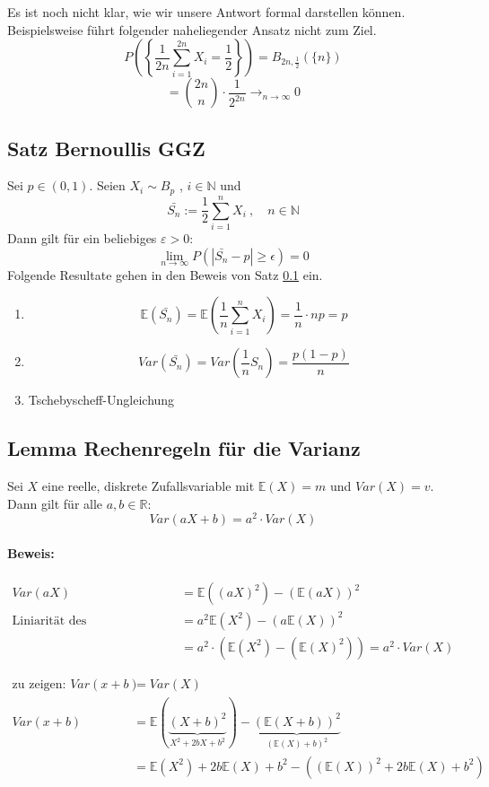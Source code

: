 \documentclass[12pt,a4paper]{article}
\begin{document}
	Es ist noch nicht klar, wie wir unsere Antwort formal darstellen können. Beispielsweise führt folgender naheliegender Ansatz nicht zum Ziel.
	$$P\left(\left\{ \frac{1}{2n}\sum_{i=1}^{2n}X_i = \frac{1}{2}\right\}\right) = B_{2n, \frac{1}{2}}(\{n\})$$
	$$=\binom{2n}{n}\cdot \frac{1}{2^{2n}}\rightarrow_{n\rightarrow\infty} 0$$
	
	\subsection{Satz Bernoullis GGZ}
	\label{bernoulliGGZ}
	Sei $p\in(0,1)$. Seien $X_i \sim B_p$ , $i\in\mathbb{N}$ und 
	$$\bar{S_n}:=\frac{1}{2}\sum_{i=1}^{n}X_i \: , \quad n\in\mathbb{N}$$
	Dann gilt für ein beliebiges $\varepsilon >0$:
	$$\lim_{n\to\infty} P\left(\left| \bar{S_n}-p\right|\geq\epsilon \right)=0$$	
	Folgende Resultate gehen in den Beweis von Satz \ref{bernoulliGGZ} ein.
	\begin{enumerate}
		\item $$\mathbb{E}(\bar{S_n})=\mathbb{E}\left(\frac{1}{n}\sum_{i=1}^n X_i\right)= \frac{1}{n}\cdot np= p$$
		\item $$Var(\bar{S_n})=Var\left(\frac{1}{n}S_n\right)=\frac{p(1-p)}{n}$$
		\item Tschebyscheff-Ungleichung
	\end{enumerate}	 
	
	\subsection{Lemma Rechenregeln für die Varianz}
	Sei $X$ eine reelle, diskrete Zufallsvariable mit $\mathbb{E}(X)=m$ und $Var(X)=v$. Dann gilt für alle $a,b\in\mathbb{R}$:
	$$Var(aX+b)=a^2\cdot Var(X)$$
	\paragraph{Beweis:}
	
	\begin{align*}
	Var(aX) &=\mathbb{E}\left(\left(aX\right)^2\right)-\left(\mathbb{E}\left(aX\right)\right)^2\\
	\text{Liniarität des Erwartungswertes (siehe 5.6 } &= a^2\mathbb{E}(X^2)-(a\mathbb{E}(X))^2\\
	&= a^2\cdot (\mathbb{E}(X^2)-(\mathbb{E}(X)^2))=a^2\cdot Var(X)
	\end{align*}
	
	\begin{align*}
	\text{zu zeigen: } Var(x+b)&=Var(X)\\
	Var(x+b) &=\mathbb{E}(\underbrace{(X+b)^2}_{X^2+2bX+b^2})-\underbrace{(\mathbb{E}(X+b))^2}_{(\mathbb{E}(X)+b)^2}\\
	&= \mathbb{E}(X^2)+2b\mathbb{E}(X)+b^2-\left(\left(\mathbb{E}\left(X\right)\right)^2+2b\mathbb{E}\left(X\right)+b^2\right)
	\end{align*}		
\end{document}
